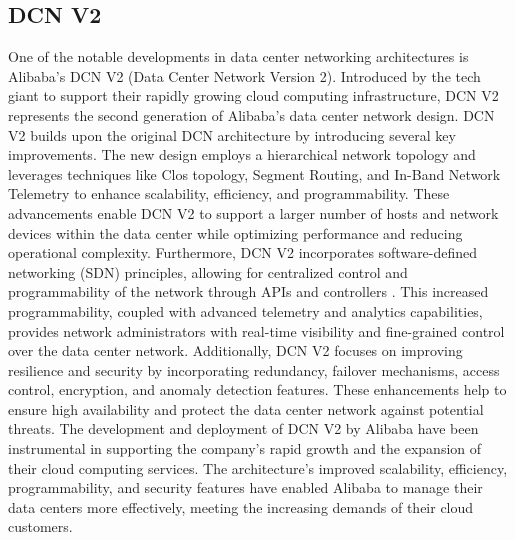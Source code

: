 \documentclass{sigkddExp}
\begin{document}
\subsection{DCN V2}
\vspace{3mm}
One of the notable developments in data center networking architectures is Alibaba's DCN V2 (Data Center Network Version 2). Introduced by the tech giant to support their rapidly growing cloud computing infrastructure, DCN V2 represents the second generation of Alibaba's data center network design.
\vspace{3mm}\newline
DCN V2 builds upon the original DCN architecture by introducing several key improvements. The new design employs a hierarchical network topology and leverages techniques like Clos topology, Segment Routing, and In-Band Network Telemetry to enhance scalability, efficiency, and programmability. These advancements enable DCN V2 to support a larger number of hosts and network devices within the data center while optimizing performance and reducing operational complexity.
\vspace{3mm}\newline
Furthermore, DCN V2 incorporates software-defined networking (SDN) principles, allowing for centralized control and programmability of the network through APIs and controllers . This increased programmability, coupled with advanced telemetry and analytics capabilities, provides network administrators with real-time visibility and fine-grained control over the data center network.
\vspace{3mm}\newline
Additionally, DCN V2 focuses on improving resilience and security by incorporating redundancy, failover mechanisms, access control, encryption, and anomaly detection features. These enhancements help to ensure high availability and protect the data center network against potential threats.
\vspace{3mm}\newline
The development and deployment of DCN V2 by Alibaba have been instrumental in supporting the company's rapid growth and the expansion of their cloud computing services. The architecture's improved scalability, efficiency, programmability, and security features have enabled Alibaba to manage their data centers more effectively, meeting the increasing demands of their cloud customers.
\end{document}
